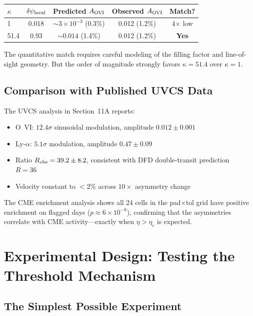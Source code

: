 \documentclass[12pt,a4paper]{article}
\theoremstyle{remark}
\begin{document}
\begin{center}
\begin{tabular}{lcccc}
\toprule
$\kappa$ & $\delta\psi_{\rm local}$ & Predicted $A_{\rm OVI}$ & Observed $A_{\rm OVI}$ & Match? \\
\midrule
1 & 0.018 & $\sim 3 \times 10^{-3}$ (0.3\%) & 0.012 (1.2\%) & 4$\times$ low \\
51.4 & 0.93 & $\sim 0.014$ (1.4\%) & 0.012 (1.2\%) & \textbf{Yes} \\
\bottomrule
\end{tabular}
\end{center}

The quantitative match requires careful modeling of the filling factor and
line-of-sight geometry. But the order of magnitude strongly favors
$\kappa = 51.4$ over $\kappa = 1$.

\subsection{Comparison with Published UVCS Data}

The UVCS analysis in Section~11A reports:
\begin{itemize}
\item O~VI: $12.4\sigma$ sinusoidal modulation, amplitude $0.012 \pm 0.001$
\item Ly-$\alpha$: $5.1\sigma$ modulation, amplitude $0.47 \pm 0.09$
\item Ratio $R_{\rm obs} = 39.2 \pm 8.2$, consistent with DFD double-transit
  prediction $R = 36$
\item Velocity constant to $<$2\% across $10\times$ asymmetry change
\end{itemize}

The CME enrichment analysis shows all 24 cells in the pad$\times$tol grid
have positive enrichment on flagged days ($p \approx 6 \times 10^{-8}$),
confirming that the asymmetries correlate with CME activity---exactly when
$\eta > \eta_c$ is expected.

\section{Experimental Design: Testing the Threshold Mechanism}

\subsection{The Simplest Possible Experiment}
\end{document}
